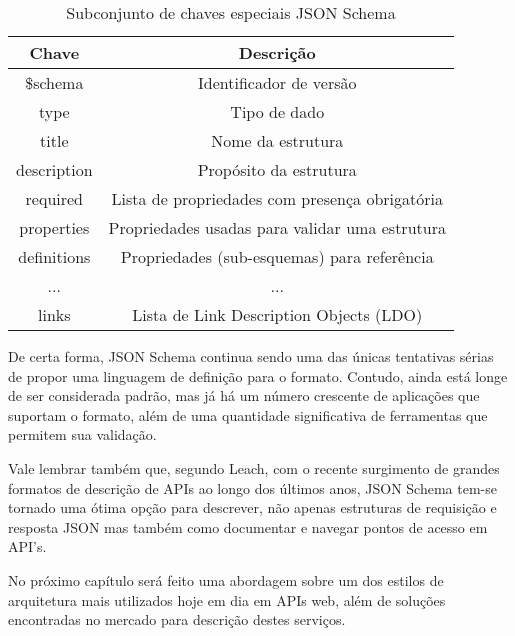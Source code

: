 \begin{table}[ht!]
  \centering
  \begin{tabular}{|c|c|}
    \hline
    Chave & Descrição \\
    \hline
    \$schema & Identificador de versão \\
    \hline
    type & Tipo de dado \\
    \hline
    title & Nome da estrutura \\
    \hline
    description & Propósito da estrutura \\
    \hline
    required & Lista de propriedades com presença obrigatória \\
    \hline
    properties & Propriedades usadas para validar uma estrutura \\
    \hline
    definitions & Propriedades (sub-esquemas) para referência \\
    \hline
    ... & ... \\
    \hline
    links & Lista de Link Description Objects (LDO) \\
    \hline
  \end{tabular}
  \caption{Subconjunto de chaves especiais JSON Schema}
\end{table}

De certa forma, JSON Schema continua sendo uma das únicas tentativas sérias de propor uma linguagem de definição para o formato. Contudo, ainda está longe de ser considerada padrão, mas já há um número crescente de aplicações que suportam o formato, além de uma quantidade significativa de ferramentas que permitem sua validação. \cite{PezoaEtAl2016}

Vale lembrar também que, segundo Leach, com o recente surgimento de grandes formatos de descrição de APIs ao longo dos últimos anos, JSON Schema tem-se tornado uma ótima opção para descrever, não apenas estruturas de requisição e resposta JSON mas também como documentar e navegar pontos de acesso em API's. \cite{Leach2014}

No próximo capítulo será feito uma abordagem sobre um dos estilos de arquitetura mais utilizados hoje em dia em APIs web, além de soluções encontradas no mercado para descrição destes serviços.
